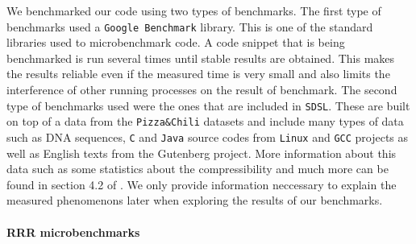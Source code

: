 We benchmarked our code using two types of benchmarks. The first type of benchmarks used
a \texttt{Google Benchmark} library. This is one of the standard libraries used to
microbenchmark code. A code snippet that is being benchmarked is run several times until
stable results are obtained. This makes the results reliable even if the measured time is
very small and also limits the interference of other running processes on the result of
benchmark. The second type of benchmarks used were the ones that are included in \texttt{SDSL}.
These are built on top of a data from the \texttt{Pizza\&Chili} datasets \citep{ferragina2005pizza}
and include many types of data such as DNA sequences, \texttt{C} and \texttt{Java} source codes from
\texttt{Linux} and \texttt{GCC} projects as well as English texts from the Gutenberg project.
More information about this data such as some statistics about the compressibility and much
more can be found in section 4.2 of \cite{ferragina2009compressed}. We only provide information
neccessary to explain the measured phenomenons later when exploring the results of our benchmarks.

\paragraph{RRR microbenchmarks}

